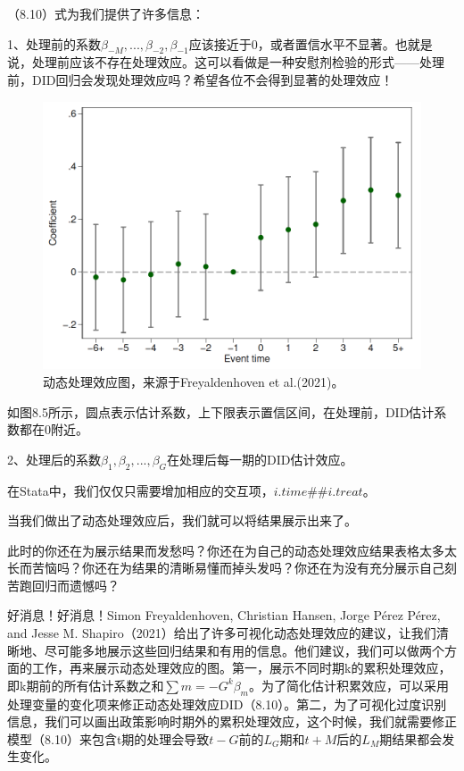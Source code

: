 \documentclass[cn,12pt,math=newtx,citestyle=gb7714-2015,bibstyle=gb7714-2015]{elegantbook}
\begin{document}
	（8.10）式为我们提供了许多信息：
	
	1、处理前的系数$\beta_{-M},...,\beta_{-2},\beta_{-1}$应该接近于0，或者置信水平不显著。也就是说，处理前应该不存在处理效应。这可以看做是一种安慰剂检验的形式——处理前，DID回归会发现处理效应吗？希望各位不会得到显著的处理效应！
	
	\begin{figure}[tbph]
		\centering
		\includegraphics[width=0.7\linewidth]{dynamicDID}
		\caption{动态处理效应图，来源于Freyaldenhoven et al.(2021)。}
		\label{fig:dynamicdid}
	\end{figure}
	
	如图8.5所示，圆点表示估计系数，上下限表示置信区间，在处理前，DID估计系数都在0附近。
	
	
	2、处理后的系数$\beta_{1},\beta_{2},...,\beta_{G}$在处理后每一期的DID估计效应。
	
	在Stata中，我们仅仅只需要增加相应的交互项，$i.time \#\# i.treat$。
	
	当我们做出了动态处理效应后，我们就可以将结果展示出来了。
	
	此时的你还在为展示结果而发愁吗？你还在为自己的动态处理效应结果表格太多太长而苦恼吗？你还在为结果的清晰易懂而掉头发吗？你还在为没有充分展示自己刻苦跑回归而遗憾吗？
	
	好消息！好消息！Simon Freyaldenhoven, Christian Hansen, Jorge Pérez Pérez, and Jesse M. Shapiro（2021）给出了许多可视化动态处理效应的建议，让我们清晰地、尽可能多地展示这些回归结果和有用的信息。他们建议，我们可以做两个方面的工作，再来展示动态处理效应的图。第一，展示不同时期k的累积处理效应，即k期前的所有估计系数之和$\sum{m=-G}^{k}\beta_m$。为了简化估计积累效应，可以采用处理变量的变化项来修正动态处理效应DID（8.10）。第二，为了可视化过度识别信息，我们可以画出政策影响时期外的累积处理效应，这个时候，我们就需要修正模型（8.10）来包含t期的处理会导致$t-G$前的$L_G$期和$t+M$后的$L_M$期结果都会发生变化。
	
\end{document}
